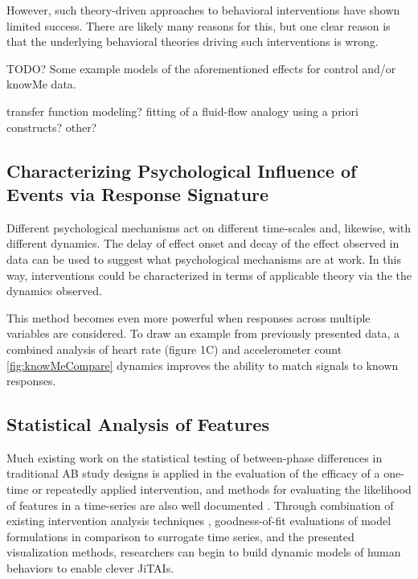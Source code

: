 However, such theory-driven approaches to  behavioral interventions have shown limited success. 
There are likely many reasons for this, but one clear reason is that the underlying behavioral theories driving such interventions is wrong.


TODO? Some example models of the aforementioned effects for control and/or knowMe data.

transfer function modeling?
fitting of a fluid-flow analogy using a priori constructs?
other?

\subsection{Characterizing Psychological Influence of Events via Response Signature}
Different psychological mechanisms act on different time-scales and, likewise, with different dynamics. 
The delay of effect onset and decay of the effect observed in data can be used to suggest what psychological mechanisms are at work.
In this way, interventions could be characterized in terms of applicable theory via the the dynamics observed.

This method becomes even more powerful when responses across multiple variables are considered.
To draw an example from previously presented data, a combined analysis of heart rate (figure 1C) and accelerometer count \ref{fig:knowMeCompare} dynamics improves the ability to match signals to known responses.

\subsection{Statistical Analysis of Features}
Much existing work on the statistical testing of between-phase differences in traditional AB study designs \cite{parker2003} is applied in the evaluation of the efficacy of a one-time or repeatedly applied intervention, and methods for evaluating the likelihood of features in a time-series are also well documented \cite{gorman1996, suen1989}.
Through combination of existing intervention analysis techniques \cite{box1975}, goodness-of-fit evaluations of model formulations \cite{pankratz2012} in comparison to surrogate time series, and the presented visualization methods, researchers can begin to build dynamic models of human behaviors to enable clever JiTAIs.
